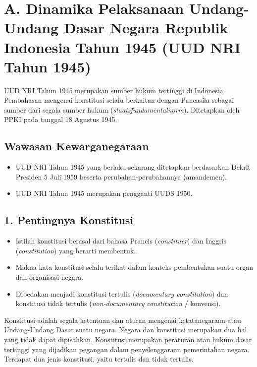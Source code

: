 \section{A. Dinamika Pelaksanaan Undang-Undang Dasar Negara Republik Indonesia Tahun 1945 (UUD NRI Tahun 1945)}

UUD NRI Tahun 1945 merupakan sumber hukum tertinggi di Indonesia. Pembahasan mengenai konstitusi selalu berkaitan dengan Pancasila sebagai sumber dari segala sumber hukum (\textit{staatsfundamentalnorm}). Ditetapkan oleh PPKI pada tanggal 18 Agustus 1945.

\subsection{Wawasan Kewarganegaraan}
\begin{itemize}
    \item UUD NRI Tahun 1945 yang berlaku sekarang ditetapkan berdasarkan Dekrit Presiden 5 Juli 1959 beserta perubahan-perubahannya (amandemen).
    \item UUD NRI Tahun 1945 merupakan pengganti UUDS 1950.
\end{itemize}

\subsection{1. Pentingnya Konstitusi}
\begin{itemize}
    \item Istilah konstitusi berasal dari bahasa Prancis (\textit{constituer}) dan Inggris (\textit{constitution}) yang berarti membentuk.
    \item Makna kata konstitusi selalu terikat dalam konteks pembentukan suatu organ dan organisasi negara.
    \item Dibedakan menjadi konstitusi tertulis (\textit{documentary constitution}) dan konstitusi tidak tertulis (\textit{non-documentary constitution} / konvensi).
\end{itemize}

Konstitusi adalah segala ketentuan dan aturan mengenai ketatanegaraan atau Undang-Undang Dasar suatu negara. Negara dan konstitusi merupakan dua hal yang tidak dapat dipisahkan. Konstitusi merupakan peraturan atau hukum dasar tertinggi yang dijadikan pegangan dalam penyelenggaraan pemerintahan negara. Terdapat dua jenis konstitusi, yaitu tertulis dan tidak tertulis.

